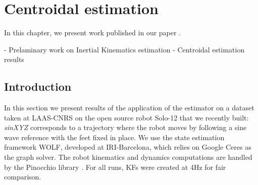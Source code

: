 \chapter{Centroidal estimation}
\label{chp:centroidal_estimation}
\minitoc
\bigskip


In this chapter, we present work published in our paper \cite{fourmy2021contact}.

- Prelaminary work on Inertial Kinematics estimation
- Centroidal estimation results

\section{Introduction}


In this section we present results of the application of the estimator on a dataset taken at LAAS-CNRS on the open source robot Solo-12 
\cite{grimminger2020open} that we recently built:
\textit{sinXYZ} corresponds to a trajectory where the robot moves by following a sine wave reference with the feet fixed in place. 
%
We use the state estimation framework WOLF, developed at IRI-Barcelona, which relies on Google Ceres \cite{ceres-solver} as the graph solver. 
The robot kinematics and dynamics computations are handled by the Pinocchio library \cite{carpentier2015pinocchio}. For all runs, KFs were created 
at 4Hz for fair comparison.


